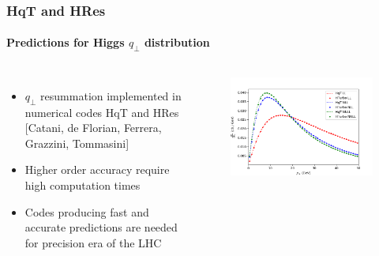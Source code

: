 \documentclass[aspectratio=43]{beamer}
\begin{document}
\begin{frame}

	\frametitle{HqT and HRes}
	\framesubtitle{Predictions for Higgs $q_{\perp}$ distribution}
	
	\footnotesize
	
	\begin{columns}
		
			
		\begin{itemize}
			\item $q_{\perp}$ resummation implemented in numerical codes HqT and HRes {\color{blue}[Catani, de Florian, Ferrera, Grazzini, Tommasini]} 
			\item Higher order accuracy require {\color{red}high computation times}
			\item Codes producing fast and accurate predictions are needed for precision era of the LHC
		\end{itemize}

	
		\begin{figure}
			\includegraphics[width = 7 cm]{plots/part3/chapter6/higgs_qt_all.png}
		\end{figure}		
			
	\end{columns}

\end{frame}
\end{document}
